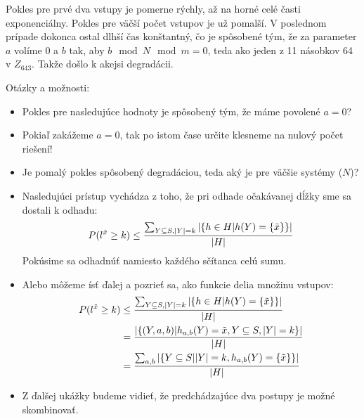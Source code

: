 Pokles pre prvé dva vstupy je pomerne rýchly, až na horné celé časti exponenciálny. Pokles pre väčší počet vstupov je už pomalší. V poslednom prípade dokonca ostal dlhší čas konštantný, čo je spôsobené tým, že za parameter $a$ volíme 0 a $b$ tak, aby $b \mod N \mod m = 0$, teda ako jeden z 11 násobkov 64 v $Z_{643}$. Takže došlo k akejsi degradácii.

Otázky a možnosti:
\begin{itemize}
\item Pokles pre nasledujúce hodnoty je spôsobený tým, že máme povolené $a = 0$?
\item Pokiaľ zakážeme $a = 0$, tak po istom čase určite klesneme na nulový počet riešení!
\item Je pomalý pokles spôsobený degradáciou, teda aký je pre väčšie systémy ($N$)?
\item Nasledujúci prístup vychádza z toho, že pri odhade očakávanej dĺžky sme sa dostali k odhadu:
\begin{displaymath}
P(l^{\tilde{x}} \geq k) \leq \frac{\sum\displaylimits_{Y \subseteq S, |Y| = k} | \{ h \in H | h(Y) = \{\tilde{x}\} \}|}{|H|}
\end{displaymath}
Pokúsime sa odhadnúť namiesto každého sčítanca celú sumu.
\item Alebo môžeme ísť ďalej a pozrieť sa, ako funkcie delia množinu vstupov:
\begin{displaymath}
\begin{split}
P(l^{\tilde{x}} \geq k)
	& \leq \frac{\sum\displaylimits_{Y \subseteq S, |Y| = k} | \{ h \in H | h(Y) = \{\tilde{x}\} \}|}{|H|} \\
	& = \frac{\left|\{ (Y, a, b) | h_{a, b}(Y) = {\tilde{x}}, Y \subseteq S, |Y| = k\}\right|}{|H|} \\
	& = \frac{\sum\displaylimits_{a, b} |\{Y \subseteq S | |Y| = k, h_{a, b}(Y) = \{\tilde{x}\} \}|}{|H|}
\end{split}
\end{displaymath}
\item Z ďalšej ukážky budeme vidieť, že predchádzajúce dva postupy je možné skombinovať.
\end{itemize}

